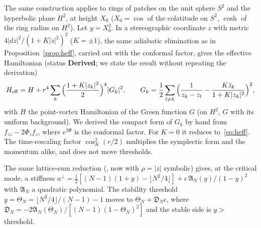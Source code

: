 \documentclass[11pt]{article}
\theoremstyle{definition}
\theoremstyle{remark}
\newcommand{\floor}[1]{\lfloor #1\rfloor}
\newcommand{\code}[1]{\path{#1}}
\begin{document}
The same construction applies to rings of patches on the unit sphere $S^2$ and the hyperbolic plane $H^2$, at height
$X_0$ ($X_0=\cos$ of the colatitude on $S^2$, $\cosh$ of the ring radius on $H^2$). Let $y=X_0^2$. In a stereographic
coordinate $z$ with metric $4|dz|^2/(1+K|z|^2)^2$ ($K=\pm1$), the same adiabatic elimination as in Proposition~\ref{prop:heff},
carried out with the conformal factor, gives the effective Hamiltonian (status \textbf{Derived}; we state the result
without repeating the derivation)
\[ H_{\rm eff}=H+r^4\sum_k\Big(\frac{1+K|z_k|^2}2\Big)^4|G_k|^2,\qquad
G_k=\frac12\sum_{l\ne k}\Big(\frac1{z_k-z_l}-\frac{K\bar z_k}{1+K|z_k|^2}\Big)^2, \]
with $H$ the point-vortex Hamiltonian of the Green function $G$ (on $H^2$, $G$ with its uniform background). We derived the
compact form of $G_k$ by hand from $f_{zz}-2\Phi_zf_z$, where $e^{2\Phi}$ is the conformal factor. For $K=0$ it reduces
to~\eqref{eq:heff}. The time-rescaling factor $\cos_K^2(r/2)$ multiplies the symplectic form and the momentum alike, and
does not move thresholds.

The same lattice-sum reduction (\code{code/blocks.py}, now with $\rho=|z|$ symbolic) gives, at the critical mode, a
stiffness $a^\perp=\frac12[(N-1)(1+y)-\floor{N^2/4}]+\epsilon\,\mathfrak A_N(y)/(1-y)^2$ with $\mathfrak A_N$ a quadratic
polynomial. The stability threshold $y=\Theta_N=\floor{N^2/4}/(N-1)-1$ moves to $\Theta_N+\mathfrak D_N\epsilon$, where
$\mathfrak D_N=-2\mathfrak A_N(\Theta_N)/[(N-1)(1-\Theta_N)^2]$ and the stable side is $y>$ threshold.
\end{document}

